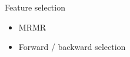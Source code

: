     \begin{frame}{Feature selection}
      \begin{itemize}
        \item MRMR
        \item Forward / backward selection
      \end{itemize}
    \end{frame}





